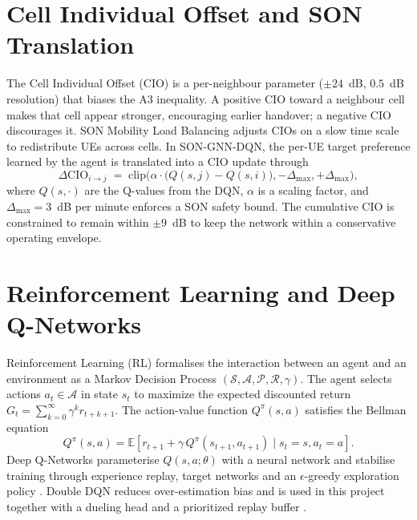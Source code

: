 \documentclass[12pt,a4paper,oneside]{report}
\begin{document}
\section{Cell Individual Offset and SON Translation}

The Cell Individual Offset (CIO) is a per-neighbour parameter
($\pm 24$~dB, $0.5$~dB resolution) that biases the A3 inequality. A
positive CIO toward a neighbour cell makes that cell appear stronger,
encouraging earlier handover; a negative CIO discourages it. SON
Mobility Load Balancing adjusts CIOs on a slow time scale to redistribute
UEs across cells. In SON-GNN-DQN, the per-UE target preference learned
by the agent is translated into a CIO update through
\begin{equation}
    \Delta\mathrm{CIO}_{i \to j} \;=\;
    \mathrm{clip}\!\Big(
    \alpha\cdot\big(Q(s, j) - Q(s, i)\big),
    -\Delta_{\max}, +\Delta_{\max}
    \Big),
    \label{eq:cio_translation}
\end{equation}
where $Q(s,\cdot)$ are the Q-values from the DQN, $\alpha$ is a scaling
factor, and $\Delta_{\max} = 3$~dB per minute enforces a SON safety
bound. The cumulative CIO is constrained to remain within $\pm 9$~dB to
keep the network within a conservative operating envelope.

\section{Reinforcement Learning and Deep Q-Networks}

Reinforcement Learning (RL) formalises the interaction between an agent
and an environment as a Markov Decision Process
$(\mathcal{S}, \mathcal{A}, \mathcal{P}, \mathcal{R}, \gamma)$. The
agent selects actions $a_t \in \mathcal{A}$ in state $s_t$ to maximize
the expected discounted return
$G_t = \sum_{k=0}^{\infty}\gamma^{k} r_{t+k+1}$.
The action-value function $Q^{\pi}(s,a)$ satisfies the Bellman equation
\begin{equation}
    Q^{\pi}(s,a) = \mathbb{E}\!\left[ r_{t+1} + \gamma\,
    Q^{\pi}(s_{t+1}, a_{t+1}) \mid s_t=s, a_t=a \right].
\end{equation}
Deep Q-Networks parameterise $Q(s,a;\theta)$ with a neural network and
stabilise training through experience replay, target networks and an
$\epsilon$-greedy exploration policy \cite{mnih_dqn_2015}. Double DQN
\cite{vanhasselt_doubledqn} reduces over-estimation bias and is used in
this project together with a dueling head \cite{wang_dueling_2016} and
a prioritized replay buffer \cite{schaul_per_2016}.
\end{document}
